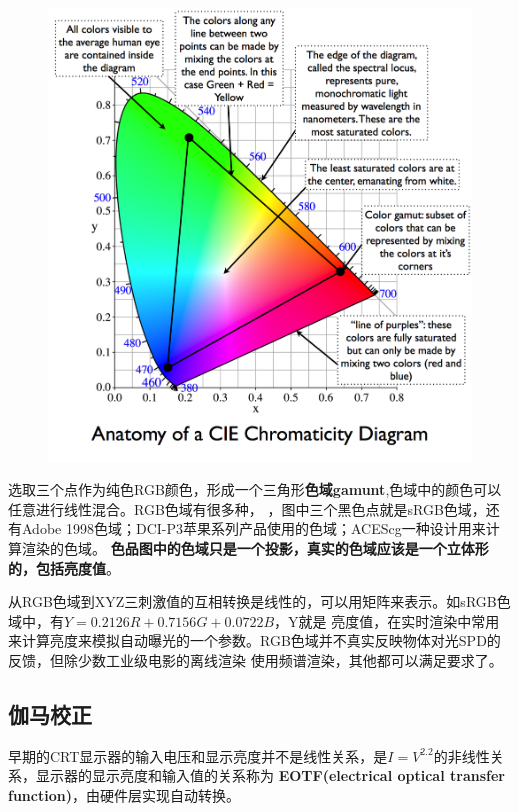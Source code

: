 \begin{figure}[h]
    \centering
    \includegraphics[width=1\textwidth]{images/anatomy-of-a-cie-1931-color-space.png}
\end{figure}

选取三个点作为纯色RGB颜色，形成一个三角形\textbf{色域gamunt},色域中的颜色可以任意进行线性混合。RGB色域有很多种，
，图中三个黑色点就是sRGB色域，还有Adobe 1998色域；DCI-P3苹果系列产品使用的色域；ACEScg一种设计用来计算渲染的色域。
\textbf{色品图中的色域只是一个投影，真实的色域应该是一个立体形的，包括亮度值}。

从RGB色域到XYZ三刺激值的互相转换是线性的，可以用矩阵来表示。如sRGB色域中，有$Y = 0.2126R + 0.7156G + 0.0722B$，Y就是
亮度值，在实时渲染中常用来计算亮度来模拟自动曝光的一个参数。RGB色域并不真实反映物体对光SPD的反馈，但除少数工业级电影的离线渲染
使用频谱渲染，其他都可以满足要求了。

\subsection{伽马校正}

早期的CRT显示器的输入电压和显示亮度并不是线性关系，是$I=V^{2.2}$的非线性关系，显示器的显示亮度和输入值的关系称为
\textbf{EOTF(electrical optical transfer function)}，由硬件层实现自动转换。

